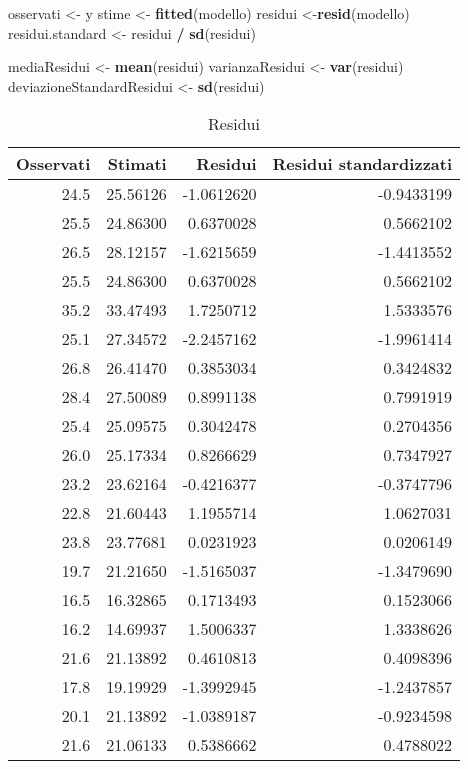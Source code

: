 \documentclass[]{book}
\newenvironment{Shaded}{\begin{snugshade}}{\end{snugshade}}
\newcommand{\KeywordTok}[1]{\textcolor[rgb]{0.13,0.29,0.53}{\textbf{#1}}}
\newcommand{\StringTok}[1]{\textcolor[rgb]{0.31,0.60,0.02}{#1}}
\newcommand{\OperatorTok}[1]{\textcolor[rgb]{0.81,0.36,0.00}{\textbf{#1}}}
\newcommand{\NormalTok}[1]{#1}
\begin{document}
\begin{Shaded}
\begin{Highlighting}[]
\NormalTok{osservati <-}\StringTok{ }\NormalTok{y}
\NormalTok{stime <-}\StringTok{ }\KeywordTok{fitted}\NormalTok{(modello)}
\NormalTok{residui <-}\KeywordTok{resid}\NormalTok{(modello)}
\NormalTok{residui.standard <-}\StringTok{ }\NormalTok{residui }\OperatorTok{/}\StringTok{ }\KeywordTok{sd}\NormalTok{(residui)}

\NormalTok{mediaResidui <-}\StringTok{ }\KeywordTok{mean}\NormalTok{(residui)}
\NormalTok{varianzaResidui <-}\StringTok{ }\KeywordTok{var}\NormalTok{(residui)}
\NormalTok{deviazioneStandardResidui <-}\StringTok{ }\KeywordTok{sd}\NormalTok{(residui)}
\end{Highlighting}
\end{Shaded}

\begin{table}

\caption{\label{tab:modello-lineare-residui}Residui}
\centering
\begin{tabular}[t]{r|r|r|r}
\hline
Osservati & Stimati & Residui & Residui standardizzati\\
\hline
24.5 & 25.56126 & -1.0612620 & -0.9433199\\
\hline
25.5 & 24.86300 & 0.6370028 & 0.5662102\\
\hline
26.5 & 28.12157 & -1.6215659 & -1.4413552\\
\hline
25.5 & 24.86300 & 0.6370028 & 0.5662102\\
\hline
35.2 & 33.47493 & 1.7250712 & 1.5333576\\
\hline
25.1 & 27.34572 & -2.2457162 & -1.9961414\\
\hline
26.8 & 26.41470 & 0.3853034 & 0.3424832\\
\hline
28.4 & 27.50089 & 0.8991138 & 0.7991919\\
\hline
25.4 & 25.09575 & 0.3042478 & 0.2704356\\
\hline
26.0 & 25.17334 & 0.8266629 & 0.7347927\\
\hline
23.2 & 23.62164 & -0.4216377 & -0.3747796\\
\hline
22.8 & 21.60443 & 1.1955714 & 1.0627031\\
\hline
23.8 & 23.77681 & 0.0231923 & 0.0206149\\
\hline
19.7 & 21.21650 & -1.5165037 & -1.3479690\\
\hline
16.5 & 16.32865 & 0.1713493 & 0.1523066\\
\hline
16.2 & 14.69937 & 1.5006337 & 1.3338626\\
\hline
21.6 & 21.13892 & 0.4610813 & 0.4098396\\
\hline
17.8 & 19.19929 & -1.3992945 & -1.2437857\\
\hline
20.1 & 21.13892 & -1.0389187 & -0.9234598\\
\hline
21.6 & 21.06133 & 0.5386662 & 0.4788022\\
\hline
\end{tabular}
\end{table}
\end{document}
